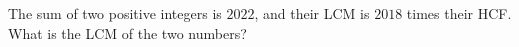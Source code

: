 The sum of two positive integers is $2022$, and their LCM is $2018$ times their HCF. What is the LCM of the two numbers?
